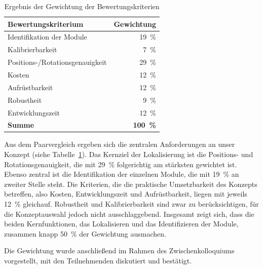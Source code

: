 \begin{table}[htbp]
    \centering
    \caption{Ergebnis der Gewichtung der Bewertungskriterien}
    \label{tab:gewichtung}
    \renewcommand{\arraystretch}{1.3}
    \begin{tabular}{l r}
        \toprule
        \textbf{Bewertungskriterium} & \textbf{Gewichtung} \\
        \midrule
        Identifikation der Module         & \SI{19}{\percent} \\
        Kalibrierbarkeit                  &  \SI{7}{\percent} \\
        Positions-/Rotationsgenauigkeit   & \SI{29}{\percent} \\
        Kosten                            & \SI{12}{\percent} \\
        Aufrüstbarkeit                    & \SI{12}{\percent} \\
        Robustheit                        &  \SI{9}{\percent} \\
        Entwicklungszeit                  & \SI{12}{\percent} \\
        \midrule
        \textbf{Summe}                    & \textbf{\SI{100}{\percent}} \\
        \bottomrule
    \end{tabular}
\end{table}

Aus dem Paarvergleich ergeben sich die zentralen Anforderungen an unser Konzept (siehe Tabelle~\ref{tab:gewichtung}). Das Kernziel der Lokalisierung ist die Positions- und Rotationsgenauigkeit, die mit \SI{29}{\percent} folgerichtig am stärksten gewichtet ist. Ebenso zentral ist die Identifikation der einzelnen Module, die mit \SI{19}{\percent} an zweiter Stelle steht. Die Kriterien, die die praktische Umsetzbarkeit des Konzepts betreffen, also Kosten, Entwicklungszeit und Aufrüstbarkeit, liegen mit jeweils \SI{12}{\percent} gleichauf. Robustheit und Kalibrierbarkeit sind zwar zu berücksichtigen, für die Konzeptauswahl jedoch nicht ausschlaggebend. Insgesamt zeigt sich, dass die beiden Kernfunktionen, das Lokalisieren und das Identifizieren der Module, zusammen knapp \SI{50}{\percent} der Gewichtung ausmachen.

Die Gewichtung wurde anschließend im Rahmen des Zwischenkolloquiums vorgestellt, mit den Teilnehmenden diskutiert und bestätigt.

